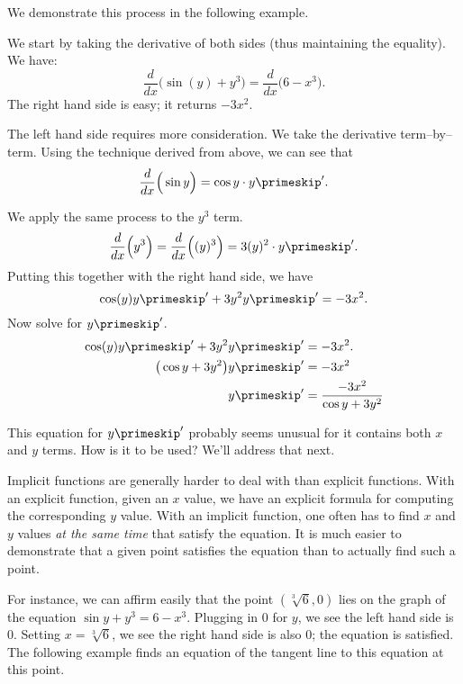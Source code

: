 
We demonstrate this process in the following example.

{We start by taking the derivative of both sides (thus maintaining the equality). We have:
\[\frac{d}{dx}\Big(\sin(y) + y^3\Big)=\frac{d}{dx}\Big(6-x^3\Big).\]
The right hand side is easy; it returns $-3x^2$. 

The left hand side requires more consideration. We take the derivative term--by--term.  Using the technique derived from  above, we can see that $$\frac{d}{dx}\Big(\sin y\Big) = \cos y \cdot y\primeskip'.$$ %

We apply the same process to the $y^3$ term. 
\[
\frac{d}{dx}\Big(y^3\Big) = \frac{d}{dx}\Big((y)^3\Big) = 3(y)^2\cdot y\primeskip'.
\]
Putting this together with the right hand side, we have
$$\cos(y)y\primeskip'+3y^2y\primeskip' = -3x^2.$$
Now solve for $y\primeskip'$.
\begin{align*}
	\cos(y)y\primeskip'+3y^2y\primeskip' 	&= -3x^2.\\
	\big(\cos y+3y^2\big)y\primeskip' &=	-3x^2\\
	y\primeskip'&=	\frac{-3x^2}{\cos y+3y^2}
\end{align*}

This equation for $y\primeskip'$ probably seems unusual for it contains both $x$ and $y$ terms. How is it to be used? We'll address that next.}

Implicit functions are generally harder to deal with than explicit functions. With an explicit function, given an $x$ value, we have an explicit formula for computing the corresponding $y$ value. With an implicit function, one often has to find $x$ and $y$ values \textit{at the same time} that satisfy the equation. It is much easier to demonstrate that a given point satisfies the equation than to actually find such a point.

For instance, we can affirm easily that the point $(\sqrt[3]{6},0)$ lies on the graph of the equation $\sin y + y^3=6-x^3$. Plugging in $0$ for $y$, we see the left hand side is $0$. Setting $x=\sqrt[3]6$, we see the right hand side is also $0$; the equation is satisfied. The following example finds an equation of the tangent line to this equation at this point.

